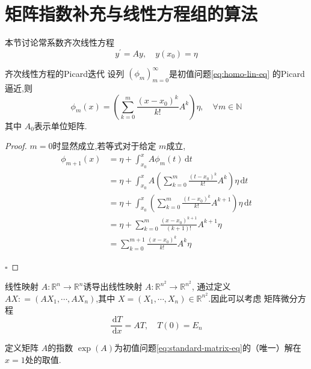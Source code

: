 \documentclass[lang=cn,12pt,color=green,fontset=none]{elegantbook}
\begin{document}
\chapter{矩阵指数补充与线性方程组的算法}



本节讨论常系数齐次线性方程 \begin{equation}\label{eq:homo-lin-eq}
    y^{\prime} =Ay,\quad y\left( x_0 \right)=\eta 
\end{equation}
\begin{lemma}{齐次线性方程的Picard迭代}\label{lem:齐次线性的Picard迭代}
    设列 \(  \left( \phi_{m} \right)_{m=0}^{\infty}   \)是初值问题\ref{eq:homo-lin-eq} 的Picard逼近,则 \[
    \phi_{m}\left( x \right)=\left( \sum _{k=0}^{m} \frac{\left( x-x_0 \right)^{k}  }{k! }A^{k}  \right)\eta  ,\quad \forall m \in \mathbb{N} 
    \]其中 \(  A_0  \)表示单位矩阵. 
\end{lemma}

\begin{proof}
     \(  m=0  \)时显然成立,若等式对于给定 \(  m  \)成立, 
    \[
    \begin{aligned}
    \phi_{m+ 1}\left( x \right)& = \eta+ \int_{x_0}^{x} A\phi_{m}\left( t \right)\,\mathrm{d} t\\ 
     & =    \eta+ \int_{x_0}^{x} A\left( \sum _{k=0}^{m} \frac{\left( t-x_0 \right)^{k}  }{k! }A^{k}  \right)\eta \,\mathrm{d} t\\ 
      & = \eta+ \int_{x_0}^{x} \left( \sum _{k=0}^{m}  \frac{\left( t-x_0 \right)^{k}  }{k! }A^{k+ 1} \right)\eta \,\mathrm{d} t\\ 
       & =  \eta+  \sum _{k=0}^{m} \frac{\left( x-x_0 \right)^{k+ 1}  }{\left( k+ 1 \right)!  }A^{k+ 1}\eta\\ 
        & =\sum _{k=0}^{m+ 1} \frac{\left( x-x_0 \right)^{k}  }{k! }A^{k}\eta  
    \end{aligned}
    \]

    \hfill $\square$
\end{proof}
线性映射 \(  A:\mathbb{R} ^{n}\to \mathbb{R} ^{n}  \)诱导出线性映射 \(  A:\mathbb{R} ^{n^{2}}\to \mathbb{R} ^{n^{2}}  \),   
通过定义 \(  AX : = \left( AX_1,\cdots ,AX_{n} \right)  \),其中 \(  X =\left( X_1,\cdots ,X_{n} \right)\in \mathbb{R} ^{n^{2}}   \).因此可以考虑
矩阵微分方程 \begin{equation}\label{eq:standard-matrix-eq}
    \frac{\,\mathrm{d} T }{\,\mathrm{d} x }=AT,\quad T\left( 0 \right)=E_{n}  
\end{equation}  
\begin{definition}
    定义矩阵 \(  A  \)的指数  \(  \exp \left( A \right)   \)为初值问题\ref{eq:standard-matrix-eq}的（唯一）解在 \(  x=1  \)处的取值. 
\end{definition}
\end{document}
